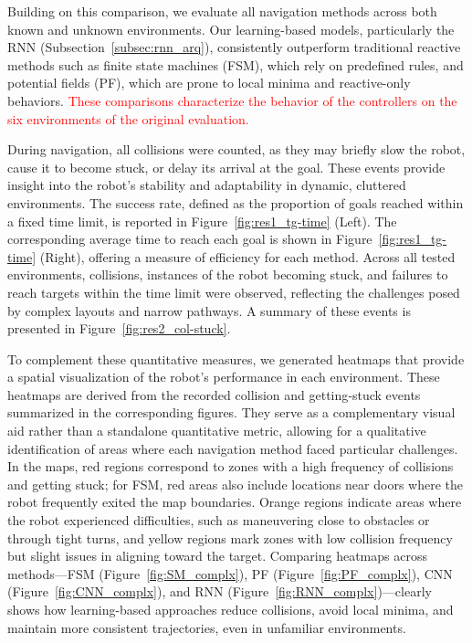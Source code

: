 \documentclass[robotics,article,submit,pdftex,moreauthors]{Definitions/mdpi}
\begin{document}
Building on this comparison, we evaluate all navigation methods across both known and unknown environments. Our learning-based models, particularly the RNN (Subsection~\ref{subsec:rnn_arq}), consistently outperform traditional reactive methods such as finite state machines (FSM), which rely on predefined rules, and potential fields (PF), which are prone to local minima and reactive-only behaviors. \textcolor{red}{These comparisons characterize the behavior of the controllers on the six environments of the original evaluation.}

During navigation, all collisions were counted, as they may briefly slow the robot, cause it to become stuck, or delay its arrival at the goal. These events provide insight into the robot’s stability and adaptability in dynamic, cluttered environments. The success rate, defined as the proportion of goals reached within a fixed time limit, is reported in Figure~\ref{fig:res1_tg-time} (Left). The corresponding average time to reach each goal is shown in Figure~\ref{fig:res1_tg-time} (Right), offering a measure of efficiency for each method. Across all tested environments, collisions, instances of the robot becoming stuck, and failures to reach targets within the time limit were observed, reflecting the challenges posed by complex layouts and narrow pathways. A summary of these events is presented in Figure~\ref{fig:res2_col-stuck}.

To complement these quantitative measures, we generated heatmaps that provide a spatial visualization of the robot’s performance in each environment. These heatmaps are derived from the recorded collision and getting‑stuck events summarized in the corresponding figures. They serve as a complementary visual aid rather than a standalone quantitative metric, allowing for a qualitative identification of areas where each navigation method faced particular challenges. In the maps, red regions correspond to zones with a high frequency of collisions and getting stuck; for FSM, red areas also include locations near doors where the robot frequently exited the map boundaries. Orange regions indicate areas where the robot experienced difficulties, such as maneuvering close to obstacles or through tight turns, and yellow regions mark zones with low collision frequency but slight issues in aligning toward the target. Comparing heatmaps across methods—FSM (Figure~\ref{fig:SM_complx}), PF (Figure~\ref{fig:PF_complx}), CNN (Figure~\ref{fig:CNN_complx}), and RNN (Figure~\ref{fig:RNN_complx})—clearly shows how learning-based approaches reduce collisions, avoid local minima, and maintain more consistent trajectories, even in unfamiliar environments.
\end{document}
